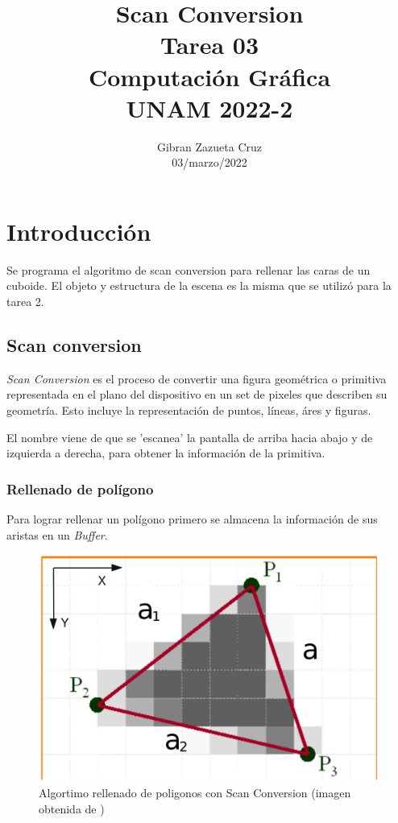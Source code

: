 \documentclass[12pt]{article}
\title{%
  Scan Conversion\\
  \large Tarea 03 \\
    \Large Computación Gráfica\\
     \large UNAM 2022-2}
\author{Gibran Zazueta Cruz \\
\small 03/marzo/2022}
\date{}
\begin{document}
\maketitle

\section{Introducción}

Se programa el algoritmo de scan conversion para rellenar las caras de un cuboide.
El objeto y estructura de la escena es la misma que se utilizó para la tarea 2.


\subsection{Scan conversion}

\textit{Scan Conversion} es el proceso de convertir una figura geométrica o primitiva representada en el plano del dispositivo en un set de pixeles que describen su geometría. Esto incluye la representación de puntos, líneas, áres y figuras.
  
El nombre viene de que se 'escanea' la pantalla de arriba hacia abajo y de izquierda a derecha, para obtener la información de la primitiva.

\subsubsection{Rellenado de polígono
}

Para lograr rellenar un polígono primero se almacena la información de sus aristas en un \textit{Buffer}.


\begin{figure}[H]
\centering
\includegraphics[scale=0.5]{images/scanfillED.png}
\caption{Algortimo rellenado de poligonos con Scan Conversion (imagen obtenida de \cite{fill})}
\end{figure}
\end{document}

